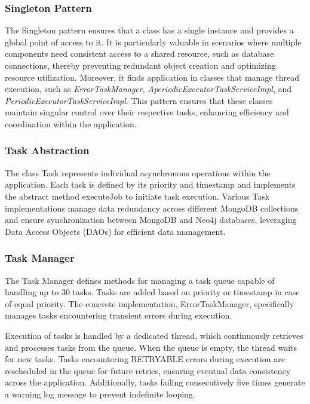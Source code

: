 \subsubsection*{Singleton Pattern}

The Singleton pattern ensures that a class has a single instance and provides a global point of access to it. It is 
particularly valuable in scenarios where multiple components need consistent access to a shared resource, such as 
database connections, thereby preventing redundant object creation and optimizing resource utilization. Moreover, 
it finds application in classes that manage thread execution, such as \textit{ErrorTaskManager}, 
\textit{AperiodicExecutorTaskServiceImpl}, and \textit{PeriodicExecutorTaskServiceImpl}. This pattern ensures that 
these classes maintain singular control over their respective tasks, enhancing efficiency and coordination within the application.

\subsubsection*{Task Abstraction}

The class Task represents individual asynchronous operations within the application. Each task is defined by its priority and timestamp 
and implements the abstract method executeJob to initiate task execution. Various Task implementations manage data redundancy across different 
MongoDB collections and ensure synchronization between MongoDB and Neo4j databases, leveraging Data Access Objects (DAOs) for efficient data management.

\subsubsection*{Task Manager}

The Task Manager defines methods for managing a task queue capable of handling up to 30 tasks. Tasks are added based on priority 
or timestamp in case of equal priority. The concrete implementation, ErrorTaskManager, specifically manages tasks encountering transient errors during execution.

\vspace{\baselineskip}

Execution of tasks is handled by a dedicated thread, which continuously retrieves and processes tasks from the queue. When the queue is empty, the 
thread waits for new tasks. Tasks encountering RETRYABLE errors during execution are rescheduled in the queue for future retries, ensuring eventual
data consistency across the application. Additionally, tasks failing consecutively five times generate a warning log message to prevent indefinite looping.

